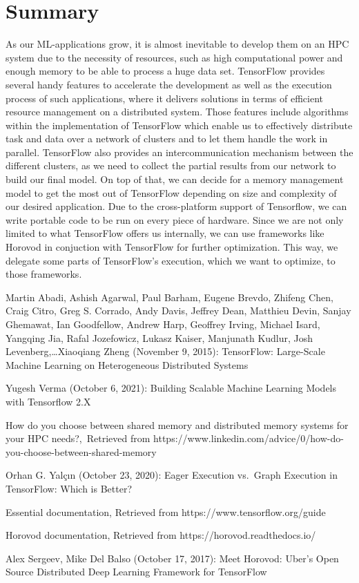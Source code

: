 \documentclass[ieeetran]{article}
\begin{document}
\section{Summary} %
\label{sec:summary}
As our ML-applications grow, it is almost inevitable to develop them on an HPC system due to the necessity of resources, such as high computational power and enough memory to be able to process a huge data set. TensorFlow provides several handy features to accelerate the development as well as the execution process of such applications, where it delivers solutions in terms of efficient resource management on a distributed system. Those features include algorithms within the implementation of TensorFlow which enable us to effectively distribute task and data over a network of clusters and to let them handle the work in parallel. TensorFlow also provides an intercommunication mechanism between the different clusters, as we need to collect the partial results from our network to build our final model. On top of that, we can decide for a memory management model to get the most out of TensorFlow depending on size and complexity of our desired application. Due to the cross-platform support of Tensorflow, we can write portable code to be run on every piece of hardware. Since we are not only limited to what TensorFlow offers us internally, we can use frameworks like Horovod in conjuction with TensorFlow for further optimization. This way, we delegate some parts of TensorFlow's execution, which we want to optimize, to those frameworks.


\pagebreak
\begin{thebibliography}{3}

Martin Abadi, Ashish Agarwal, Paul Barham, Eugene Brevdo, Zhifeng Chen, Craig Citro, Greg S. Corrado, Andy Davis, Jeffrey Dean, Matthieu Devin, Sanjay Ghemawat, Ian Goodfellow, Andrew Harp, Geoffrey Irving, Michael Isard, Yangqing Jia, Rafal Jozefowicz, Lukasz Kaiser, Manjunath Kudlur, Josh Levenberg,\ldots Xiaoqiang Zheng (November 9, 2015): TensorFlow: Large-Scale Machine Learning on Heterogeneous Distributed Systems 

Yugesh Verma (October 6, 2021): Building Scalable Machine Learning Models with Tensorflow 2.X

How do you choose between shared memory and distributed memory systems for your HPC needs?,\ Retrieved from https://www.linkedin.com/advice/0/how-do-you-choose-between-shared-memory 

Orhan G. Yalçın (October 23, 2020): Eager Execution vs.\ Graph Execution in TensorFlow: Which is Better? 

Essential documentation, Retrieved from https://www.tensorflow.org/guide 

Horovod documentation, Retrieved from https://horovod.readthedocs.io/

Alex Sergeev, Mike Del Balso (October 17, 2017): Meet Horovod: Uber’s Open Source Distributed Deep Learning Framework for TensorFlow
\end{thebibliography}
\end{document}
